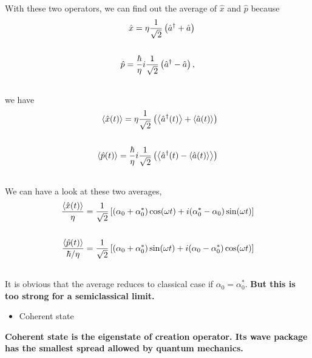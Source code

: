 \documentclass[letterpaper,10pt,english]{sphinxmanual}
\begin{document}
With these two operators, we can find out the average of $\hat x$ and $\hat p$ because
\begin{gather}
\begin{split}\hat x = \eta \frac{1}{\sqrt 2} \left( \hat a^\dagger + \hat a\right)\\\\
\hat p = \frac{\hbar}{\eta} i \frac{1}{\sqrt 2} \left(\hat a^\dagger - \hat a \right) ,\end{split}\notag\\\begin{split}\end{split}\notag
\end{gather}
we have
\begin{gather}
\begin{split}\left< \hat x(t) \right> = \eta \frac{1}{\sqrt 2} \left( \left< \hat a^\dagger (t) \right> + \left< \hat a(t) \right> \right) \\\\
\left< \hat p(t) \right> = \frac{\hbar}{\eta} i \frac{1}{\sqrt {2} } \left( \left< \hat a^\dagger (t) - \left< \hat a(t) \right> \right> \right)\end{split}\notag\\\begin{split}\end{split}\notag
\end{gather}
We can have a look at these two averages,
\begin{gather}
\begin{split}\frac{\left< \hat x(t) \right> }{\eta} = \frac{1}{\sqrt{2} } \left[ (\alpha_0 + \alpha_0^*)\cos(\omega t) + i (\alpha_0^* - \alpha_0 ) \sin(\omega t) \right] \\\\
\frac{\left< \hat p(t) \right>}{\hbar/\eta} = \frac{1}{\sqrt{2}} \left[ (\alpha_0 + \alpha_0^*) \sin(\omega t) + i( \alpha_0 - \alpha_0^*)\cos(\omega t) \right]\end{split}\notag\\\begin{split}\end{split}\notag
\end{gather}
It is obvious that the average reduces to classical case if $\alpha_0 = \alpha_0^*$. \textbf{But this is too strong for a semiclassical limit.}
\begin{itemize}
\item {} 
Coherent state

\end{itemize}

\textbf{Coherent state is the eigenstate of creation operator. Its wave package has the smallest spread allowed by quantum mechanics.}
\end{document}
